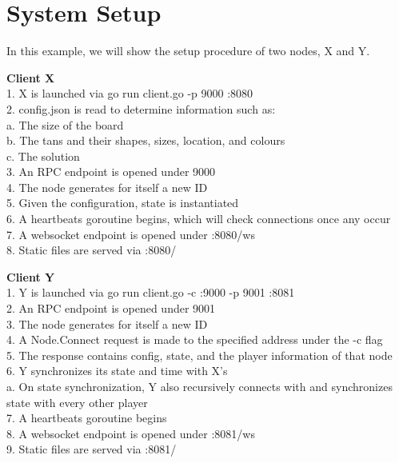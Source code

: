 \documentclass[twocolumn]{article}
\begin{document}
\section{System Setup}
\begin{flushleft}
In this example, we will show the setup procedure of two nodes, X and Y.

\textbf{Client X}\\
1. X is launched via go run client.go -p 9000 :8080\\
2. config.json is read to determine information such as:\\
\hspace*{1em}a. The size of the board\\
\hspace*{1em}b. The tans and their shapes, sizes, location, and colours\\
\hspace*{1em}c. The solution\\
3. An RPC endpoint is opened under 9000\\
4. The node generates for itself a new ID\\
5. Given the configuration, state is instantiated\\
6. A heartbeats goroutine begins, which will check connections once any occur\\
7. A websocket endpoint is opened under :8080/ws\\
8. Static files are served via :8080/

\textbf{Client Y}\\
1. Y is launched via go run client.go -c :9000 -p 9001 :8081\\
2. An RPC endpoint is opened under 9001\\
3. The node generates for itself a new ID\\
4. A Node.Connect request is made to the specified address under the -c flag\\
5. The response contains config, state, and the player information of that node\\
6. Y synchronizes its state and time with X’s\\
\hspace*{1em}a. On state synchronization, Y also recursively connects with and synchronizes state with every other player\\
7. A heartbeats goroutine begins\\
8. A websocket endpoint is opened under :8081/ws\\
9. Static files are served via :8081/
\end{flushleft}
\end{document}
